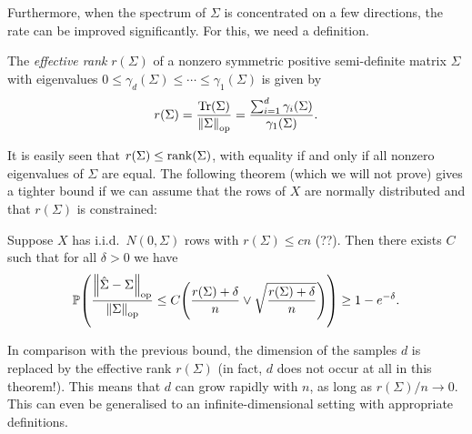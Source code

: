 Furthermore, when the spectrum of $\Sigma$ is concentrated on a few directions, the rate can be improved significantly. For this, we need a definition.
\begin{definition}
	The \emph{effective rank} $r(\Sigma)$ of a nonzero symmetric positive semi-definite matrix $\Sigma$ with eigenvalues $0 \leq \gamma_d(\Sigma) \leq \dotsb \leq \gamma_1(\Sigma)$ is given by
	\[
	r(\Sigma) = \frac{\Tr(\Sigma)}{\norm{\Sigma}_\mathrm{op}} = \frac{\sum_{i=1}^d \gamma_i(\Sigma)}{\gamma_1(\Sigma)}. 
	\]
\end{definition}
It is easily seen that $r(\Sigma) \leq \mathrm{rank}(\Sigma)$, with equality if and only if all nonzero eigenvalues of $\Sigma$ are equal. The following theorem (which we will not prove) gives a tighter bound if we can assume that the rows of $X$ are normally distributed and that $r(\Sigma)$ is constrained:
\begin{theorem}
	Suppose $X$ has i.i.d.\ $N(0, \Sigma)$ rows with $r(\Sigma) \leq cn$ (??). Then there exists $C$ such that for all $\delta > 0$ we have
	\[
	\mathbb P\qty(\frac{\norm{\hat\Sigma - \Sigma}_\mathrm{op}}{\norm{\Sigma}_\mathrm{op}} \leq C \qty(\frac{r(\Sigma) + \delta}{n} \lor \sqrt{\frac{r(\Sigma) + \delta}{n}})) \geq 1 - e^{-\delta}. 
	\]
\end{theorem}

In comparison with the previous bound, the dimension of the samples $d$ is replaced by the effective rank $r(\Sigma)$ (in fact, $d$ does not occur at all in this theorem!). This means that $d$ can grow rapidly with $n$, as long as $r(\Sigma)/n \to 0$. This can even be generalised to an infinite-dimensional setting with appropriate definitions. 